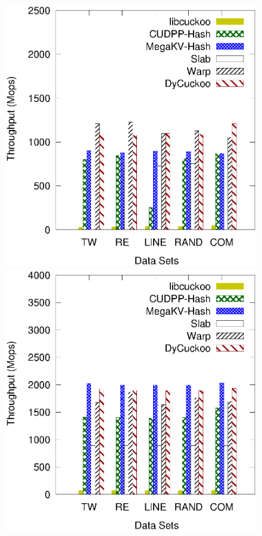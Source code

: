 \begin{figure}[t]
	\begin{minipage}{0.48\linewidth}\centering
		\includegraphics[width=\linewidth]{pic/static/static_insert.eps}
		\centerline{}
	\end{minipage}
	\hfill
	\begin{minipage}{0.48\linewidth}\centering
		\includegraphics[width=\linewidth]{pic/static/static_search.eps}
		\centerline{}
	\end{minipage}
	\caption{}
	\label{fig:static-all}
\end{figure}
